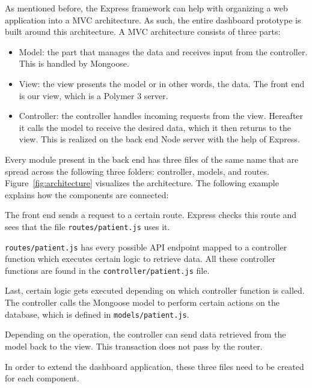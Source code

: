         As mentioned before, the Express framework can help with organizing a web application into a MVC architecture. As such, the entire dashboard prototype is built around this architecture. A MVC architecture consists of three parts:
        \begin{itemize}
            \item Model: the part that manages the data and receives input from the controller. This is handled by Mongoose.
            \item View: the view presents the model or in other words, the data. The front end is our view, which is a Polymer 3 server.
            \item Controller: the controller handles incoming requests from the view. Hereafter it calls the model to receive the desired data, which it then returns to the view. This is realized on the back end Node server with the help of Express.
        \end{itemize}

        \noindent Every module present in the back end has three files of the same name that are spread across the following three folders: controller, models, and routes. Figure~\ref{fig:architecture} visualizes the architecture. The following example explains how the components are connected:
        \begin{myenumerate}
            \item The front end sends a request to a certain route. Express checks this route and sees that the file \texttt{routes/patient.js} uses it. 
            \item \texttt{routes/patient.js} has every possible API endpoint mapped to a controller function which executes certain logic to retrieve data. All these controller functions are found in the \texttt{controller/patient.js} file.
            \item Last, certain logic gets executed depending on which controller function is called. The controller calls the Mongoose model to perform certain actions on the database, which is defined in \texttt{models/patient.js}.
            \item Depending on the operation, the controller can send data retrieved from the model back to the view. This transaction does not pass by the router.
        \end{myenumerate}

        \noindent In order to extend the dashboard application, these three files need to be created for each component.

